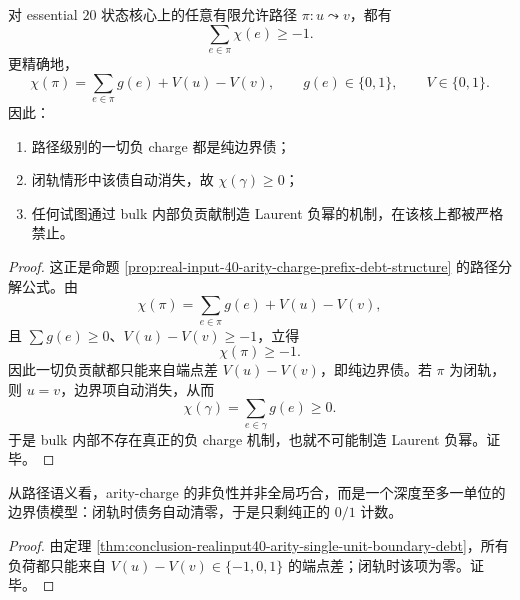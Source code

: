 \begin{theorem}[有限路径负荷的单单位边界债]\label{thm:conclusion-realinput40-arity-single-unit-boundary-debt}
对 essential \(20\) 状态核心上的任意有限允许路径 \(\pi:u\leadsto v\)，都有
\[
\sum_{e\in\pi}\chi(e)\ge -1.
\]
更精确地，
\[
\chi(\pi)=\sum_{e\in\pi}g(e)+V(u)-V(v),
\qquad
g(e)\in\{0,1\},
\qquad
V\in\{0,1\}.
\]
因此：
\begin{enumerate}
  \item 路径级别的一切负 charge 都是纯边界债；
  \item 闭轨情形中该债自动消失，故 \(\chi(\gamma)\ge 0\)；
  \item 任何试图通过 bulk 内部负贡献制造 Laurent 负幂的机制，在该核上都被严格禁止。
\end{enumerate}
\end{theorem}
\begin{proof}
这正是命题 \ref{prop:real-input-40-arity-charge-prefix-debt-structure} 的路径分解公式。由
\[
\chi(\pi)=\sum_{e\in\pi}g(e)+V(u)-V(v),
\]
且 \(\sum g(e)\ge 0\)、\(V(u)-V(v)\ge -1\)，立得
\[
\chi(\pi)\ge -1.
\]
因此一切负贡献都只能来自端点差 \(V(u)-V(v)\)，即纯边界债。若 \(\pi\) 为闭轨，则 \(u=v\)，边界项自动消失，从而
\[
\chi(\gamma)=\sum_{e\in\gamma}g(e)\ge 0.
\]
于是 bulk 内部不存在真正的负 charge 机制，也就不可能制造 Laurent 负幂。证毕。
\end{proof}

\begin{corollary}\label{cor:conclusion-realinput40-arity-boundary-debt-model}
从路径语义看，arity-charge 的非负性并非全局巧合，而是一个深度至多一单位的边界债模型：闭轨时债务自动清零，于是只剩纯正的 \(0/1\) 计数。
\end{corollary}
\begin{proof}
由定理 \ref{thm:conclusion-realinput40-arity-single-unit-boundary-debt}，所有负荷都只能来自 \(V(u)-V(v)\in\{-1,0,1\}\) 的端点差；闭轨时该项为零。证毕。
\end{proof}

